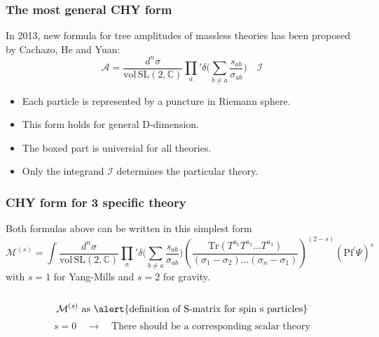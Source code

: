 \documentclass{beamer}
\begin{document}
\begin{frame}
    \frametitle{The most general CHY form}
    In 2013, new formula for tree amplitudes of massless theories has been proposed by Cachazo, He and Yuan:
    \begin{equation*}
        \mathcal{A}=\boxed{\frac{d^n\sigma}{\mathrm{vol\,SL}(2,\mathbb{C})}\prod_a{'}\delta\bigg(\sum_{b\neq a}\frac{s_{ab}}{\sigma_{ab}}\bigg)}\quad \mathcal{I}
    \end{equation*}
    \begin{itemize}
        \item Each particle is represented by a puncture in Riemann sphere.
        \item This form holds for general D-dimension.
        \item The boxed part is \alert{universial for all theories}.
        \item Only the integrand $\mathcal{I}$ determines the particular theory.
    \end{itemize}
\end{frame}
\begin{frame}
    \frametitle{CHY form for 3 specific theory}
    Both formulas above can be written in this simplest form %
    \alert{
        \begin{equation*}
            \!\!\!\!\mathcal{M}^{(s)}\!=\!\!\!\int\frac{d^n\sigma}{\mathrm{vol\,SL}(2,\mathbb{C})}\prod_a{'}\delta\bigg(\sum_{b\neq a}\frac{s_{ab}}{\sigma_{ab}}\bigg)
            \!\!\!\left(\frac{\mathrm{Tr}(T^{a_1}T^{a_2}\dots T^{a_3})}{(\sigma_1-\sigma_2)\dots (\sigma_n-\sigma_1)}\right)^{(2-s)}\!{(\mathrm{Pf}^\prime\Psi)}^s
        \end{equation*}}
    with $s=1$ for Yang-Mills and $s=2$ for gravity.
    \\ \hspace*{\fill}\\
    \pause
    \begin{equation*}
        \mathcal{M}^{(s)} \text{ as \alert{definition of S-matrix for spin s particles}}
    \end{equation*}
    \begin{equation*}
        s=0\quad\to \quad \text{There should be a corresponding scalar theory}
    \end{equation*}
\end{frame}
\end{document}
